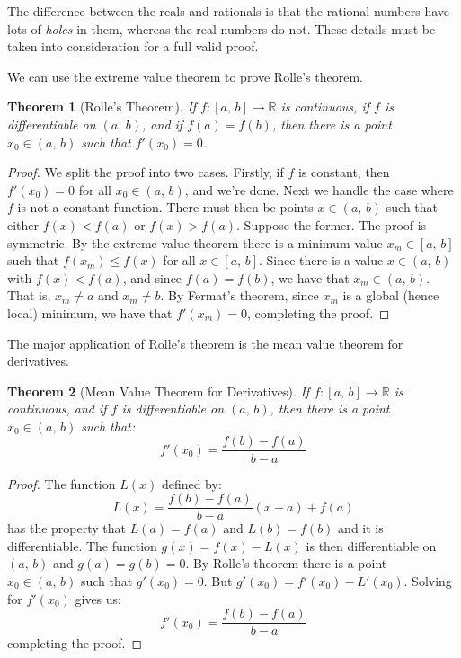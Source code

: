 \documentclass{article}
\theoremstyle{plain}
\newtheorem{theorem}{Theorem}
\begin{document}
    The difference between the reals and rationals is that the rational numbers
    have lots of \textit{holes} in them, whereas the real numbers do not.
    These details must be taken into consideration for a full valid proof.
    \par\hfill\par
    We can use the extreme value theorem to prove Rolle's theorem.
    \begin{theorem}[Rolle's Theorem]
        If $f:[a,\,b]\rightarrow\mathbb{R}$ is continuous, if $f$ is
        differentiable on $(a,\,b)$, and if $f(a)=f(b)$, then there is a
        point $x_{0}\in(a,\,b)$ such that $f'(x_{0})=0$.
    \end{theorem}
    \begin{proof}
        We split the proof into two cases. Firstly, if $f$ is constant, then
        $f'(x_{0})=0$ for all $x_{0}\in(a,\,b)$, and we're done. Next we handle
        the case where $f$ is not a constant function. There must then be
        points $x\in(a,\,b)$ such that either $f(x)<f(a)$ or $f(x)>f(a)$.
        Suppose the former. The proof is symmetric. By the extreme value theorem
        there is a minimum value $x_{m}\in[a,\,b]$ such that
        $f(x_{m})\leq{f}(x)$ for all $x\in[a,\,b]$. Since there is a value
        $x\in(a,\,b)$ with $f(x)<f(a)$, and since $f(a)=f(b)$, we have that
        $x_{m}\in(a,\,b)$. That is, $x_{m}\ne{a}$ and $x_{m}\ne{b}$. By
        Fermat's theorem, since $x_{m}$ is a global (hence local) minimum,
        we have that $f'(x_{m})=0$, completing the proof.
    \end{proof}
    The major application of Rolle's theorem is the mean value theorem for
    derivatives.
    \begin{theorem}[Mean Value Theorem for Derivatives]
        If $f:[a,\,b]\rightarrow\mathbb{R}$ is continuous, and if
        $f$ is differentiable on $(a,\,b)$, then there is a point
        $x_{0}\in(a,\,b)$ such that:
        \begin{equation}
            f'(x_{0})=\frac{f(b)-f(a)}{b-a}
        \end{equation}
    \end{theorem}
    \begin{proof}
        The function $L(x)$ defined by:
        \begin{equation}
            L(x)=\frac{f(b)-f(a)}{b-a}(x-a)+f(a)
        \end{equation}
        has the property that $L(a)=f(a)$ and $L(b)=f(b)$
        and it is differentiable. The function
        $g(x)=f(x)-L(x)$ is then differentiable on $(a,\,b)$ and
        $g(a)=g(b)=0$. By Rolle's theorem there is a point
        $x_{0}\in(a,\,b)$ such that $g'(x_{0})=0$. But
        $g'(x_{0})=f'(x_{0})-L'(x_{0})$. Solving for $f'(x_{0})$ gives us:
        \begin{equation}
            f'(x_{0})=\frac{f(b)-f(a)}{b-a}
        \end{equation}
        completing the proof.
    \end{proof}
\end{document}
